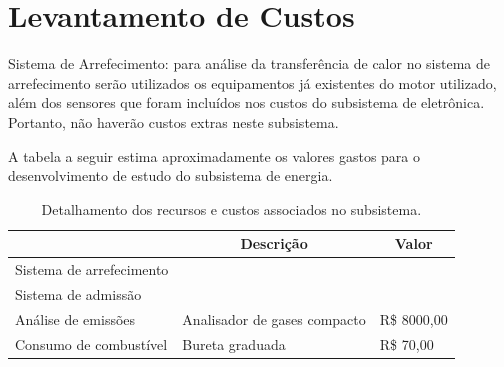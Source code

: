 \section{Levantamento de Custos}

Sistema de Arrefecimento: para análise da transferência de calor no sistema de arrefecimento serão utilizados os equipamentos já existentes do motor utilizado, além dos sensores que foram incluídos nos custos do subsistema de eletrônica. Portanto, não haverão custos extras neste subsistema. 

A tabela a seguir estima aproximadamente os valores gastos para o desenvolvimento de estudo do subsistema de energia.

\begin{table}[h!]
	\centering
	\caption{Detalhamento dos recursos e custos associados no subsistema.}
	\label{detalhamentoRecursos}
	\begin{tabular}{|l|l|l|}
		\hline
		\multicolumn{1}{|c|}{}   & \multicolumn{1}{c|}{Descrição} & \multicolumn{1}{c|}{Valor} \\ \hline
		Sistema de arrefecimento &                                &                            \\ \hline
		Sistema de admissão      &                                &                            \\ \hline
		Análise de emissões      & Analisador de gases compacto   & R\$ 8000,00                 \\ \hline
		Consumo de combustível   & Bureta graduada                & R\$ 70,00                   \\ \hline
	\end{tabular}
\end{table}

